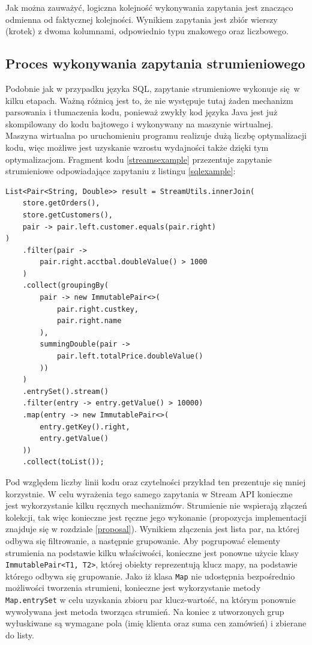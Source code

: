 \documentclass[12pt]{extarticle}
\begin{document}
    Jak można zauważyć, logiczna kolejność wykonywania zapytania jest znacząco odmienna od faktycznej kolejności. Wynikiem zapytania jest zbiór wierszy (krotek) z dwoma kolumnami, odpowiednio typu znakowego oraz liczbowego.

\subsection{Proces wykonywania zapytania strumieniowego}

    Podobnie jak w przypadku języka SQL, zapytanie strumieniowe wykonuje się w kilku etapach. Ważną różnicą jest to, że nie występuje tutaj żaden mechanizm parsowania i tłumaczenia kodu, ponieważ zwykły kod języka Java jest już skompilowany do kodu bajtowego i wykonywany na maszynie wirtualnej. Maszyna wirtualna po uruchomieniu programu realizuje dużą liczbę optymalizacji kodu, więc możliwe jest uzyskanie wzrostu wydajności także dzięki tym optymalizacjom. Fragment kodu \ref{streamsexample} przezentuje zapytanie strumieniowe odpowiadające zapytaniu z listingu \ref{sqlexample}:

\begin{lstlisting}[label=streamsexample, caption=Analogiczne rozwiązanie wykorzystujące Stream API]
List<Pair<String, Double>> result = StreamUtils.innerJoin(
    store.getOrders(),
    store.getCustomers(),
    pair -> pair.left.customer.equals(pair.right)
)
    .filter(pair ->
        pair.right.acctbal.doubleValue() > 1000
    )
    .collect(groupingBy(
        pair -> new ImmutablePair<>(
            pair.right.custkey,
            pair.right.name
        ),
        summingDouble(pair ->
            pair.left.totalPrice.doubleValue()
        ))
    )
    .entrySet().stream()
    .filter(entry -> entry.getValue() > 10000)
    .map(entry -> new ImmutablePair<>(
        entry.getKey().right,
        entry.getValue()
    ))
    .collect(toList());
\end{lstlisting}

    Pod względem liczby linii kodu oraz czytelności przykład ten prezentuje się mniej korzystnie. W celu wyrażenia tego samego zapytania w Stream API konieczne jest wykorzystanie kilku ręcznych mechanizmów. Strumienie nie wspierają złączeń kolekcji, tak więc konieczne jest ręczne jego wykonanie (propozycja implementacji znajduje się w rozdziale \ref{proposal}). Wynikiem złączenia jest lista par, na której odbywa się filtrowanie, a następnie grupowanie. Aby pogrupować elementy strumienia na podstawie kilku właściwości, konieczne jest ponowne użycie klasy \texttt{ImmutablePair<T1, T2>}, której obiekty reprezentują klucz mapy, na podstawie którego odbywa się grupowanie. Jako iż klasa \texttt{Map} nie udostępnia bezpośrednio możliwości tworzenia strumieni, konieczne jest wykorzystanie metody \texttt{Map.entrySet} w celu uzyskania zbioru par klucz-wartość, na którym ponownie wywoływana jest metoda tworząca strumień. Na koniec z utworzonych grup wyłuskiwane są wymagane pola (imię klienta oraz suma cen zamówień) i zbierane do listy.
\end{document}
